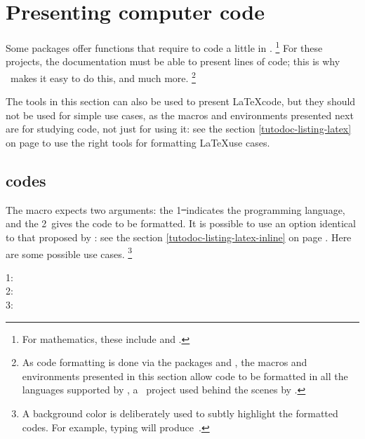 \documentclass{tutodoc}
\begin{document}
\section{Presenting computer code}

Some packages offer functions that require to code a little in \lua.%
\footnote{
	For mathematics, these include  and .
}
For these projects, the documentation must be able to present lines of code; this is why \thisproj\ makes it easy to do this, and much more.%
\footnote{
    As code formatting is done via the packages  and , the macros and environments presented in this section allow code to be formatted in all the languages supported by \pygmentsREF, a \python\ project used behind the scenes by .
}


\begin{tdocimp}
	The tools in this section can also be used to present \LaTeX code, but they should not be used for simple use cases, as the macros and environments presented next are for studying code, not just for using it: see the section \ref{tutodoc-listing-latex} on page \pageref{tutodoc-listing-latex} to use the right tools for formatting \LaTeX use cases.
\end{tdocimp}



\subsection{ codes}

The  macro expects two arguments: the 1\st\ indicates the programming language, and the 2\nd\ gives the code to be formatted.
It is possible to use an option identical to that proposed by : see the section \ref{tutodoc-listing-latex-inline} on page \pageref{tutodoc-listing-latex-inline}.
Here are some possible use cases.%
\footnote{
    A background color is deliberately used to subtly highlight the formatted codes.
    For example, typing  will produce \,.
}

\begin{tdoclatex}
1:              \\
2:  \\
3: 
\end{tdoclatex}
\end{document}
